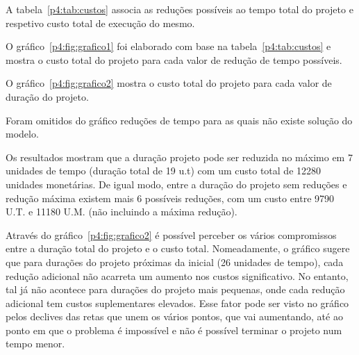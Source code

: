 A tabela~\ref{p4:tab:custos} associa as reduções possíveis ao tempo total do projeto e respetivo custo total de execução do mesmo.


 O gráfico~\ref{p4:fig:grafico1} foi elaborado com base na
 tabela~\ref{p4:tab:custos} e mostra o custo total do projeto para cada valor de
 redução de tempo possíveis.



O gráfico~\ref{p4:fig:grafico2} mostra o custo total do projeto para cada valor de duração do projeto.




Foram omitidos do gráfico reduções de tempo para as quais não existe solução do modelo.

Os resultados mostram que a duração projeto pode ser reduzida no máximo em
7 unidades  de tempo (duração total de 19 u.t) com um custo total de 12280
unidades monetárias. De igual modo, entre a duração do projeto sem reduções
e redução máxima existem mais 6 possíveis reduções, com um custo entre 9790 U.T.
e 11180 U.M. (não incluindo a máxima redução).

Através do gráfico~\ref{p4:fig:grafico2} é possível perceber os vários
compromissos entre a duração total do projeto e o custo total. Nomeadamente,
o gráfico sugere que para durações do projeto próximas da inicial (26 unidades
de tempo), cada redução adicional não acarreta um aumento nos custos
significativo. No entanto, tal já não acontece para durações do projeto mais
pequenas, onde cada redução adicional tem custos suplementares elevados. Esse
fator pode ser visto no gráfico pelos declives das retas que unem os vários
pontos, que vai aumentando, até ao ponto em que o problema é impossível e não
é possível terminar o projeto num tempo menor.
